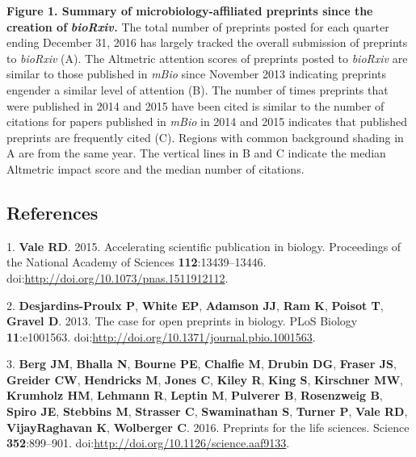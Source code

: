 \documentclass[11pt,]{article}
\begin{document}
\textbf{Figure 1. Summary of microbiology-affiliated preprints since the
creation of} \textbf{\emph{bioRxiv.}} The total number of preprints
posted for each quarter ending December 31, 2016 has largely tracked the
overall submission of preprints to \emph{bioRxiv} (A). The Altmetric
attention scores of preprints posted to \emph{bioRxiv} are similar to
those published in \emph{mBio} since November 2013 indicating preprints
engender a similar level of attention (B). The number of times preprints
that were published in 2014 and 2015 have been cited is similar to the
number of citations for papers published in \emph{mBio} in 2014 and 2015
indicates that published preprints are frequently cited (C). Regions
with common background shading in A are from the same year. The vertical
lines in B and C indicate the median Altmetric impact score and the
median number of citations.

\newpage

\subsection*{References}\label{references}

1. \textbf{Vale RD}. 2015. Accelerating scientific publication in
biology. Proceedings of the National Academy of Sciences
\textbf{112}:13439--13446.
doi:\url{http://doi.org/10.1073/pnas.1511912112}.

2. \textbf{Desjardins-Proulx P}, \textbf{White EP}, \textbf{Adamson JJ},
\textbf{Ram K}, \textbf{Poisot T}, \textbf{Gravel D}. 2013. The case for
open preprints in biology. PLoS Biology \textbf{11}:e1001563.
doi:\url{http://doi.org/10.1371/journal.pbio.1001563}.

3. \textbf{Berg JM}, \textbf{Bhalla N}, \textbf{Bourne PE},
\textbf{Chalfie M}, \textbf{Drubin DG}, \textbf{Fraser JS},
\textbf{Greider CW}, \textbf{Hendricks M}, \textbf{Jones C},
\textbf{Kiley R}, \textbf{King S}, \textbf{Kirschner MW},
\textbf{Krumholz HM}, \textbf{Lehmann R}, \textbf{Leptin M},
\textbf{Pulverer B}, \textbf{Rosenzweig B}, \textbf{Spiro JE},
\textbf{Stebbins M}, \textbf{Strasser C}, \textbf{Swaminathan S},
\textbf{Turner P}, \textbf{Vale RD}, \textbf{VijayRaghavan K},
\textbf{Wolberger C}. 2016. Preprints for the life sciences. Science
\textbf{352}:899--901. doi:\url{http://doi.org/10.1126/science.aaf9133}.
\end{document}
